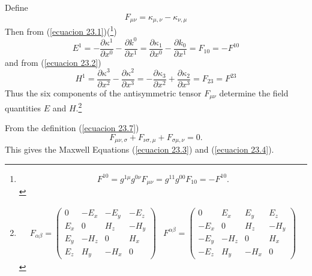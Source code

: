 Define 
\begin{equation}
\label{ecuacion 23.7}
 F_{\mu\nu} = \kappa_{\mu,\nu} - \kappa_{\nu,\mu}
\end{equation}
Then from (\ref{ecuacion 23.1})(\footnote{\[
    F^{10} = g^{1\mu}g^{0\nu} F_{\mu\nu} = g^{11}g^{00} F_{10} = - F^{10}.
\]})
\[
 E^1 = - \frac{\partial \kappa^1}{\partial x^0} - \frac{\partial k^0}{\partial x^1}
     =   \frac{\partial \kappa_1}{\partial x^0} - \frac{\partial k_0}{\partial x^1}
     =   F_{10}
     = - F^{10}
\]
and from (\ref{ecuacion 23.2})
\[
    H^1 =   \frac{\partial \kappa^3}{\partial x^2} - \frac{\partial \kappa^2}{\partial x^3}
        = - \frac{\partial \kappa_3}{\partial x^2} + \frac{\partial \kappa_2}{\partial x^3}
        = F_{23} = F^{23}
\]
Thus the six components of the antisymmetric tensor $F_{\mu\nu}$ determine the field quantities $E$ and $H$.\footnote{
\[
\begin{array}{cc}
F_{\alpha\beta} = 
\left(
    \begin{array}{cccc}
        0    &  -E_x  & -E_y &  -E_z \\
        E_x  &    0   &  H_z &  -H_y \\
        E_y  &  -H_z  &   0  &   H_x \\
        E_z  &   H_y  & -H_x &    0
    \end{array}
\right)
&
F^{\alpha\beta} = 
\left(
    \begin{array}{cccc}
         0    &   E_x  &  E_y &   E_z \\
        -E_x  &    0   &  H_z &  -H_y \\
        -E_y  &  -H_z  &   0  &   H_x \\
        -E_z  &   H_y  & -H_x &    0
    \end{array}
\right)
\end{array}
\]
}

From the definition (\ref{ecuacion 23.7})
\[
  F_{\mu\nu,\sigma} + F_{\nu\sigma,\mu} + F_{\sigma\mu,\nu} = 0.
\]
This gives the Maxwell Equations (\ref{ecuacion 23.3}) and (\ref{ecuacion 23.4}).






